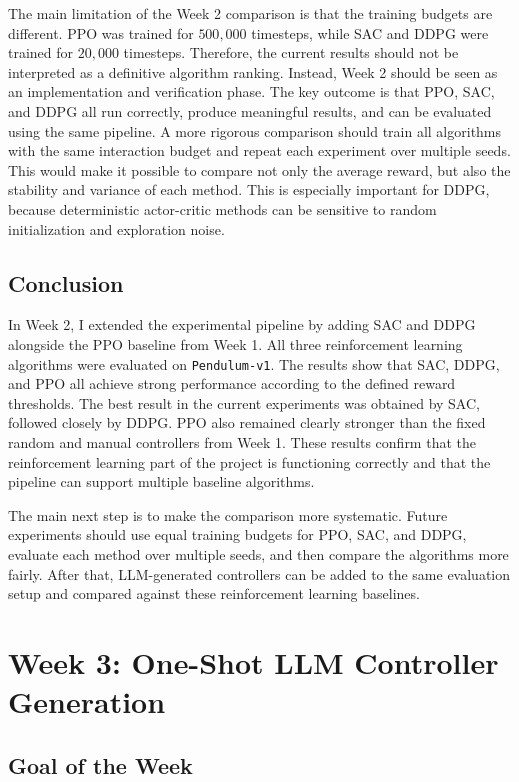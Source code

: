 \documentclass[11pt,a4paper]{article}
\begin{document}
The main limitation of the Week 2 comparison is that the training budgets are different. PPO was trained for $500{,}000$ timesteps, while SAC and DDPG were trained for $20{,}000$ timesteps. Therefore, the current results should not be interpreted as a definitive algorithm ranking. Instead, Week 2 should be seen as an implementation and verification phase. The key outcome is that PPO, SAC, and DDPG all run correctly, produce meaningful results, and can be evaluated using the same pipeline.
A more rigorous comparison should train all algorithms with the same interaction budget and repeat each experiment over multiple seeds. This would make it possible to compare not only the average reward, but also the stability and variance of each method. This is especially important for DDPG, because deterministic actor-critic methods can be sensitive to random initialization and exploration noise.

\subsection{Conclusion}

In Week 2, I extended the experimental pipeline by adding SAC and DDPG alongside the PPO baseline from Week 1. All three reinforcement learning algorithms were evaluated on \texttt{Pendulum-v1}. The results show that SAC, DDPG, and PPO all achieve strong performance according to the defined reward thresholds.
The best result in the current experiments was obtained by SAC, followed closely by DDPG. PPO also remained clearly stronger than the fixed random and manual controllers from Week 1. These results confirm that the reinforcement learning part of the project is functioning correctly and that the pipeline can support multiple baseline algorithms.

The main next step is to make the comparison more systematic. Future experiments should use equal training budgets for PPO, SAC, and DDPG, evaluate each method over multiple seeds, and then compare the algorithms more fairly. After that, LLM-generated controllers can be added to the same evaluation setup and compared against these reinforcement learning baselines.

\section{Week 3: One-Shot LLM Controller Generation}

\subsection{Goal of the Week}
\end{document}

